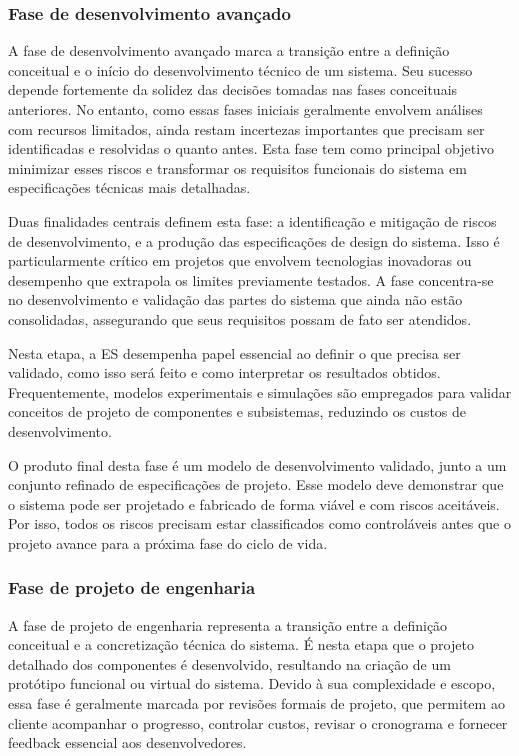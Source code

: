 	\subsubsection*{Fase de desenvolvimento avançado}
	A fase de desenvolvimento avançado marca a transição entre a definição conceitual e o início do desenvolvimento técnico de um sistema. Seu sucesso depende 
	fortemente da solidez das decisões tomadas nas fases conceituais anteriores. No entanto, como essas fases iniciais geralmente envolvem análises com recursos 
	limitados, ainda restam incertezas importantes que precisam ser identificadas e resolvidas o quanto antes. Esta fase tem como principal objetivo minimizar 
	esses riscos e transformar os requisitos funcionais do sistema em especificações técnicas mais detalhadas.

	Duas finalidades centrais definem esta fase: a identificação e mitigação de riscos de desenvolvimento, e a produção das especificações de design do sistema. 
	Isso é particularmente crítico em projetos que envolvem tecnologias inovadoras ou desempenho que extrapola os limites previamente testados. A fase 
	concentra-se no desenvolvimento e validação das partes do sistema que ainda não estão consolidadas, assegurando que seus requisitos possam de fato ser 
	atendidos.

	Nesta etapa, a ES desempenha papel essencial ao definir o que precisa ser validado, como isso será feito e como interpretar os resultados 
	obtidos. Frequentemente, modelos experimentais e simulações são empregados para validar conceitos de projeto de componentes e subsistemas, reduzindo os custos 
	de desenvolvimento.

	O produto final desta fase é um modelo de desenvolvimento validado, junto a um conjunto refinado de especificações de projeto. Esse modelo deve demonstrar que
	o sistema pode ser projetado e fabricado de forma viável e com riscos aceitáveis. Por isso, todos os riscos precisam estar classificados como controláveis 
	antes que o projeto avance para a próxima fase do ciclo de vida.

	\subsubsection*{Fase de projeto de engenharia}

	A fase de projeto de engenharia representa a transição entre a definição conceitual e a concretização técnica do sistema. É nesta etapa que o projeto detalhado 
	dos componentes é desenvolvido, resultando na criação de um protótipo funcional ou virtual do sistema. Devido à sua complexidade e escopo, essa fase é geralmente
	marcada por revisões formais de projeto, que permitem ao cliente acompanhar o progresso, controlar custos, revisar o cronograma e fornecer feedback essencial 
	aos desenvolvedores.

